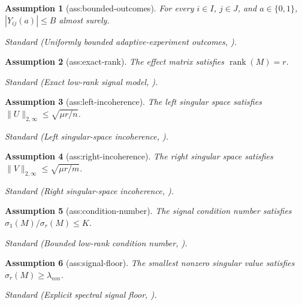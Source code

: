 \documentclass{article}
\newtheorem{assumption}{Assumption}
\begin{document}
\begin{assumption}[ass:bounded-outcomes]\label{ass:bounded-outcomes}
For every \(i\in I\), \(j\in J\), and \(a\in\{0,1\}\), \(|Y_{ij}(a)|\le B\) almost surely.
\par\smallskip\noindent\emph{Standard} (Uniformly bounded adaptive-experiment outcomes, \cite{HadadHirshbergZhanWagerAthey2021}).
\end{assumption}

\begin{assumption}[ass:exact-rank]\label{ass:exact-rank}
The effect matrix satisfies \(\operatorname{rank}(M)=r\).
\par\smallskip\noindent\emph{Standard} (Exact low-rank signal model, \cite{CaiLiChiPoorChen2021Subspace}).
\end{assumption}

\begin{assumption}[ass:left-incoherence]\label{ass:left-incoherence}
The left singular space satisfies \(\lVert U\rVert_{2,\infty}\le\sqrt{\mu r/n}\).
\par\smallskip\noindent\emph{Standard} (Left singular-space incoherence, \cite{CaiLiChiPoorChen2021Subspace}).
\end{assumption}

\begin{assumption}[ass:right-incoherence]\label{ass:right-incoherence}
The right singular space satisfies \(\lVert V\rVert_{2,\infty}\le\sqrt{\mu r/m}\).
\par\smallskip\noindent\emph{Standard} (Right singular-space incoherence, \cite{CaiLiChiPoorChen2021Subspace}).
\end{assumption}

\begin{assumption}[ass:condition-number]\label{ass:condition-number}
The signal condition number satisfies \(\sigma_1(M)/\sigma_r(M)\le K\).
\par\smallskip\noindent\emph{Standard} (Bounded low-rank condition number, \cite{CaiLiChiPoorChen2021Subspace}).
\end{assumption}

\begin{assumption}[ass:signal-floor]\label{ass:signal-floor}
The smallest nonzero singular value satisfies \(\sigma_r(M)\ge\lambda_{nm}\).
\par\smallskip\noindent\emph{Standard} (Explicit spectral signal floor, \cite{CaiLiChiPoorChen2021Subspace}).
\end{assumption}
\end{document}
